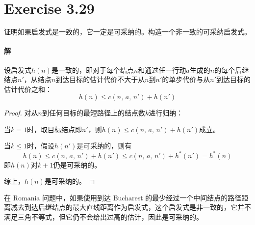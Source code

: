 \documentclass{article}
\begin{document}
\section{Exercise 3.29}
证明如果启发式是一致的，它一定是可采纳的。构造一个非一致的可采纳启发式。

\paragraph{解}
设启发式$h(n)$是一致的，即对于每个结点$n$和通过任一行动$a$生成的$n$的每个后继结点$n'$，从结点$n$到达目标的估计代价不大于从$n$到$n'$的单步代价与从$n'$到达目标的估计代价之和：$$h(n) \leq c(n,\, a,\, n') + h(n')$$
\begin{proof}
    对从$n$到任何目标的最短路径上的结点数$k$进行归纳：

    当$k = 1$时，取目标结点即$n'$，则$h(n) \leq c(n,\, a,\, n') + h(n')$成立。

    当$k \leq 1$时，假设$h(n')$是可采纳的，则有
    \begin{equation*}
        h(n) \leq c(n,\, a,\, n') + h(n') \leq c(n,\, a,\, n') + h^*(n') = h^*(n)
    \end{equation*}
    即$h(n)$对$k + 1$仍是可采纳的。

    综上，$h(n)$是可采纳的。
\end{proof}
在 Romania 问题中，如果使用到达 Bucharest 的最少经过一个中间结点的路径距离减去到达后继结点的最大直线距离作为启发式，这个启发式是非一致的，它并不满足三角不等式，但它仍不会给出过高的估计，因此是可采纳的。
\end{document}
